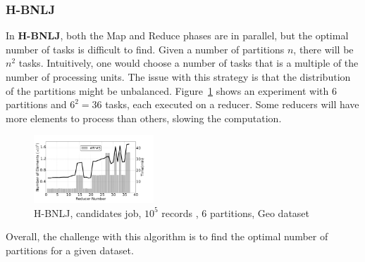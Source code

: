 \documentclass[10pt,journal,compsoc]{IEEEtran}
\newcommand{\HBNLJ}{{\bf H-BNLJ}}
\begin{document}
\subsubsection{H-BNLJ}
In \HBNLJ, both the Map and Reduce phases are in parallel, but the optimal number of tasks is difficult to 
find. Given a number of partitions $n$, there will be $n^2$ tasks. Intuitively, one would choose a number of 
tasks that is a multiple of the number of processing 
units. The issue with this strategy is that the distribution of the partitions might be unbalanced.
Figure~\ref{fig:lb_hbnlj}
shows an experiment with $6$ partitions and $6^2=36$ tasks, each executed on a reducer. Some reducers will have more elements to process than others, 
slowing the computation.
\begin{figure}[!h]
\centering
   \includegraphics[width=0.4\textwidth]{hbnlj.pdf}
   \caption{H-BNLJ, candidates job, $10^{5}$ records \label{fig:lb_hbnlj}, 6 partitions, Geo dataset}
\end{figure}%

Overall, the challenge with this algorithm is to find the optimal number of partitions for a given dataset. 
\end{document}
